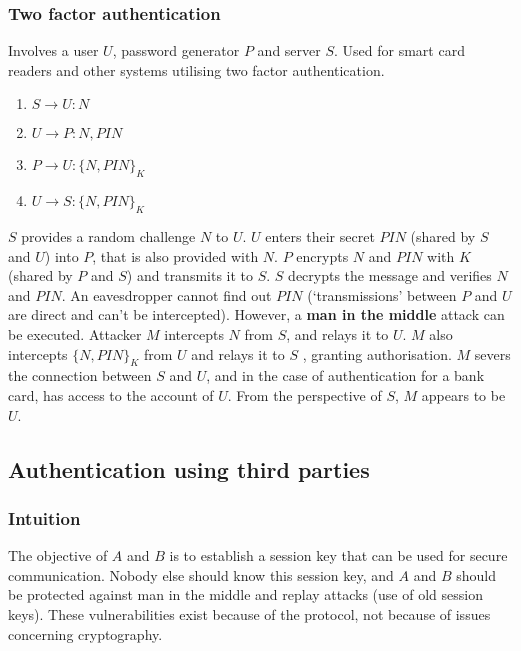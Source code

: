 \documentclass[final]{article}
\begin{document}
\subsubsection{Two factor authentication}
Involves a user $ U $, password generator $ P $ and server $ S $. Used for smart card readers and other systems utilising two factor authentication.
\begin{enumerate}
	\item $ S \rightarrow U : N $
	\item $ U \rightarrow P : N, PIN $
	\item $ P \rightarrow U : \{ N, PIN \}_{K} $
	\item $ U \rightarrow S : \{ N, PIN \}_{K} $
\end{enumerate}
$ S $ provides a random challenge $ N $ to $ U $. $ U $ enters their secret $ PIN $ (shared by $ S $ and $ U $) into $ P $, that is also provided with $ N $. $ P $ encrypts $ N $ and $ PIN $ with $ K $ (shared by $ P $ and $ S $) and transmits it to $ S $. $ S $ decrypts the message and verifies $ N $ and $ PIN $. An eavesdropper cannot find out $ PIN $ (`transmissions' between $ P $ and $ U $ are direct and can't be intercepted). However, a \textbf{man in the middle} attack can be executed. Attacker $ M $ intercepts $ N $ from $ S $, and relays it to $ U $. $ M $ also intercepts $ \{ N, PIN \}_{K} $ from $ U $ and relays it to $ S $ , granting authorisation. $ M $ severs the connection between $ S $ and $ U $, and in the case of authentication for a bank card, has access to the account of $ U $. From the perspective of $ S $, $ M $ appears to be $ U $.

\subsection{Authentication using third parties}

\subsubsection{Intuition}
The objective of $ A $ and $ B $ is to establish a session key that can be used for secure communication. Nobody else should know this session key, and $ A $ and $ B $ should be protected against man in the middle and replay attacks (use of old session keys). These vulnerabilities exist because of the protocol, not because of issues concerning cryptography.
\end{document}
